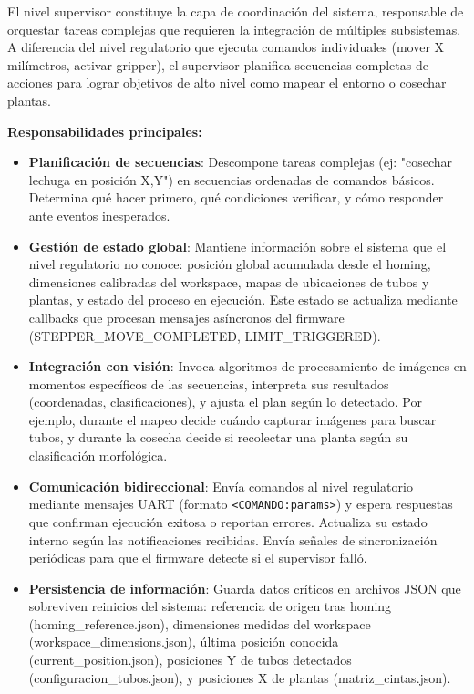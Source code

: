 El nivel supervisor constituye la capa de coordinación del sistema, responsable de orquestar tareas complejas que requieren la integración de múltiples subsistemas. A diferencia del nivel regulatorio que ejecuta comandos individuales (mover X milímetros, activar gripper), el supervisor planifica secuencias completas de acciones para lograr objetivos de alto nivel como mapear el entorno o cosechar plantas.

\textbf{Responsabilidades principales:}

\begin{itemize}
    \item \textbf{Planificación de secuencias}: Descompone tareas complejas (ej: "cosechar lechuga en posición X,Y") en secuencias ordenadas de comandos básicos. Determina qué hacer primero, qué condiciones verificar, y cómo responder ante eventos inesperados.

    \item \textbf{Gestión de estado global}: Mantiene información sobre el sistema que el nivel regulatorio no conoce: posición global acumulada desde el homing, dimensiones calibradas del workspace, mapas de ubicaciones de tubos y plantas, y estado del proceso en ejecución. Este estado se actualiza mediante callbacks que procesan mensajes asíncronos del firmware (STEPPER\_MOVE\_COMPLETED, LIMIT\_TRIGGERED).

    \item \textbf{Integración con visión}: Invoca algoritmos de procesamiento de imágenes en momentos específicos de las secuencias, interpreta sus resultados (coordenadas, clasificaciones), y ajusta el plan según lo detectado. Por ejemplo, durante el mapeo decide cuándo capturar imágenes para buscar tubos, y durante la cosecha decide si recolectar una planta según su clasificación morfológica.

    \item \textbf{Comunicación bidireccional}: Envía comandos al nivel regulatorio mediante mensajes UART (formato \texttt{<COMANDO:params>}) y espera respuestas que confirman ejecución exitosa o reportan errores. Actualiza su estado interno según las notificaciones recibidas. Envía señales de sincronización periódicas para que el firmware detecte si el supervisor falló.

    \item \textbf{Persistencia de información}: Guarda datos críticos en archivos JSON que sobreviven reinicios del sistema: referencia de origen tras homing (homing\_reference.json), dimensiones medidas del workspace (workspace\_dimensions.json), última posición conocida (current\_position.json), posiciones Y de tubos detectados (configuracion\_tubos.json), y posiciones X de plantas (matriz\_cintas.json).
\end{itemize}


